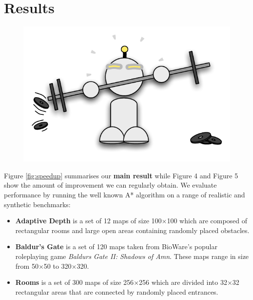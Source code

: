\section{Results}
 \begin{figure}
		\includegraphics[width=0.4\columnwidth]{diagrams/robot_weights.pdf}
 \end{figure}

Figure \ref{fig:speedup} summarises our \textbf{main result} while Figure
4 and Figure 5 show the amount of improvement we
can regularly obtain. We evaluate performance by running the well known A* algorithm on a range of realistic and synthetic benchmarks:
\begin{itemize}
\item{
\textbf{Adaptive Depth} is a set of 12 maps of size 100$\times$100 which are
composed of rectangular rooms and large open areas containing randomly placed obstacles.
}
\item{
\textbf{Baldur's Gate} is a set of 120 maps taken from BioWare's popular
roleplaying game \emph{Baldurs Gate II: Shadows of Amn}. 
These maps range in size from 50$\times$50 to 320$\times$320.
}
\item{
\textbf{Rooms} is a set of 300 maps of size 256$\times$256 which are divided into 32$\times$32
rectangular areas that are connected by randomly placed entrances.
}
\end{itemize}


